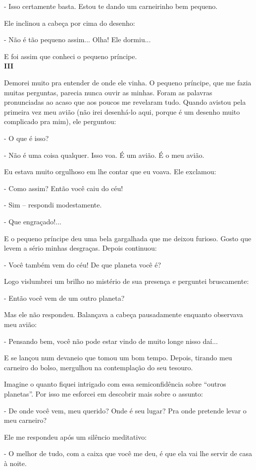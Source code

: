 \begin{Parallel}[p]{}{}
{- Isso certamente basta. Estou te dando um carneirinho bem pequeno.

Ele inclinou a cabeça por cima do desenho:

- Não é tão pequeno assim... Olha! Ele dormiu...

E foi assim que conheci o pequeno príncipe.\\

\textbf{III}

Demorei muito pra entender de onde ele vinha. O pequeno príncipe, que me
fazia muitas perguntas, parecia nunca ouvir as minhas. Foram as palavras
pronunciadas ao acaso que aos poucos me revelaram tudo. Quando avistou
pela primeira vez meu avião (não irei desenhá-lo aqui, porque é um
desenho muito complicado pra mim), ele perguntou:

- O que é isso?

- Não é uma coisa qualquer. Isso voa. É um avião. É o meu avião.

Eu estava muito orgulhoso em lhe contar que eu voava. Ele exclamou:

- Como assim? Então você caiu do céu!

- Sim -- respondi modestamente.

- Que engraçado!...

E o pequeno príncipe deu uma bela gargalhada que me deixou furioso.
Gosto que levem a sério minhas desgraças. Depois continuou:

- Você também vem do céu! De que planeta você é?

Logo vislumbrei um brilho no mistério de sua presença e perguntei
bruscamente:

- Então você vem de um outro planeta?

Mas ele não respondeu. Balançava a cabeça pausadamente enquanto
observava meu avião:

- Pensando bem, você não pode estar vindo de muito longe nisso daí...

E se lançou num devaneio que tomou um bom tempo. Depois, tirando meu
carneiro do bolso, mergulhou na contemplação do seu tesouro.

Imagine o quanto fiquei intrigado com essa semiconfidência sobre
``outros planetas''. Por isso me esforcei em descobrir mais sobre o
assunto:

- De onde você vem, meu querido? Onde é seu lugar? Pra onde pretende
levar o meu carneiro?

Ele me respondeu após um silêncio meditativo:

- O melhor de tudo, com a caixa que você me deu, é que ela vai lhe
servir de casa à noite.

}
\end{Parallel}
